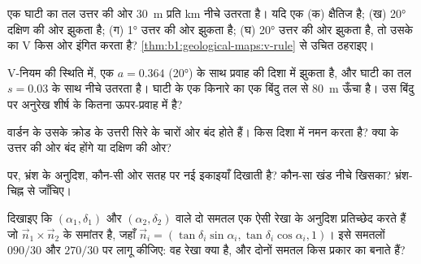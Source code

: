 \begin{exercise}[$\star\star$]\label{exo:b1:geological-maps:6}
एक घाटी का तल उत्तर की ओर \qty{30}{m} प्रति km नीचे उतरता है। यदि एक  (क) क्षैतिज है; (ख)
\ang{20} दक्षिण की ओर झुकता है; (ग) \ang{1} उत्तर की ओर झुकता है; (घ) \ang{20} उत्तर की ओर झुकता है, तो उसके 
का V किस ओर इंगित करता है? \cref{thm:b1:geological-maps:v-rule} से उचित ठहराइए।
\end{exercise}

\begin{exercise}[$\star\star$]\label{exo:b1:geological-maps:7}
V-नियम की स्थिति में, एक  $a = 0.364$ (\ang{20}) के साथ प्रवाह की दिशा में झुकता है, और घाटी का तल $s = 0.03$
के साथ नीचे उतरता है। घाटी के एक किनारे का एक बिंदु तल से \qty{80}{m} ऊँचा है। उस बिंदु पर अनुरेख शीर्ष के कितना
ऊपर-प्रवाह में है?
\end{exercise}

\begin{exercise}[$\star\star$]\label{exo:b1:geological-maps:8}
वार्डन  के  उसके क्रोड के उत्तरी सिरे के चारों ओर बंद होते हैं।  किस दिशा में नमन करता है?
क्या  के  उत्तर की ओर बंद होंगे या दक्षिण की ओर?
\end{exercise}

\begin{exercise}[$\star\star$]\label{exo:b1:geological-maps:9}
 पर, भ्रंश के अनुदिश, कौन-सी ओर सतह पर नई इकाइयाँ दिखाती है? कौन-सा खंड नीचे खिसका? भ्रंश-चिह्न से
जाँचिए।
\end{exercise}

\begin{exercise}[$\star\star\star$]\label{exo:b1:geological-maps:10}
दिखाइए कि  $(\alpha_1, \delta_1)$ और $(\alpha_2, \delta_2)$ वाले दो समतल एक ऐसी रेखा के अनुदिश प्रतिच्छेद
करते हैं जो $\vec n_1 \times \vec n_2$ के समांतर है, जहाँ $\vec n_i = (\tan\delta_i\sin\alpha_i,
\tan\delta_i\cos\alpha_i, 1)$। इसे समतलों $090/30$ और $270/30$ पर लागू कीजिए: वह रेखा क्या है, और दोनों समतल किस
प्रकार का  बनाते हैं?
\end{exercise}

